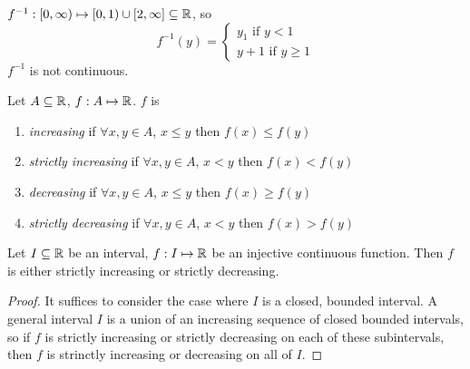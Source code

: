 \documentclass[openany]{report}
\begin{document}
    $f^{-1}: [0,\infty) \mapsto [0,1) \cup [2, \infty] \subseteq \mathbb{R}$, so 
    \[f^{-1}(y) = \begin{cases}
        y_1 \text{ if } y < 1 \\
        y + 1 \text{ if } y \geq 1
    \end{cases}\] 
    $f^{-1}$ is not continuous.
    \begin{definition}
        Let $A \subseteq \mathbb{R}$, $f: A \mapsto \mathbb{R}$. $f$ is 
        \begin{enumerate}[label=(\roman*)]
            \item \emph{increasing} if $\forall x,y \in A$, $x \leq y$ then $f(x) \leq f(y)$
            \item \emph{strictly increasing} if $\forall x,y \in A$, $x < y$ then $f(x) < f(y)$
            \item \emph{decreasing} if $\forall x,y \in A$, $x \leq y$ then $f(x) \geq f(y)$
            \item \emph{strictly decreasing} if $\forall x,y \in A$, $x < y$ then $f(x) > f(y)$
        \end{enumerate}
    \end{definition}
    \begin{lemma}
        Let $I \subseteq \mathbb{R}$ be an interval, $f: I \mapsto \mathbb{R}$ be an injective continuous function. Then $f$ is either strictly increasing or strictly decreasing. 
    \end{lemma}
    \begin{proof}
        It suffices to consider the case where $I$ is a closed, bounded interval. A general interval $I$ is a union of an increasing sequence of closed bounded intervals, so if $f$ is strictly increasing or strictly decreasing on each of these subintervals, then $f$ is strinctly increasing or decreasing on all of $I$.
    \end{proof}
\end{document}
